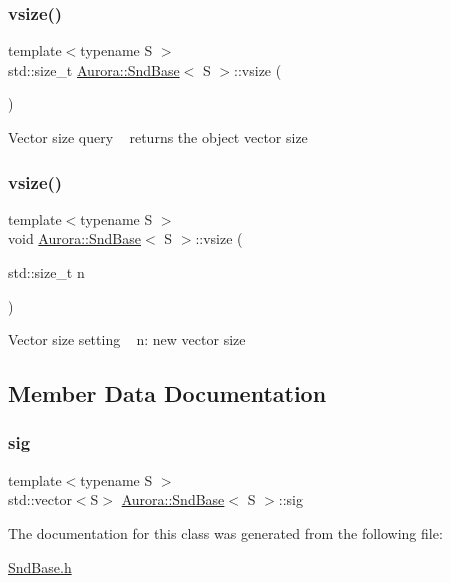 \subsubsection{\texorpdfstring{vsize()}{vsize()}\hspace{0.1cm}{\footnotesize\ttfamily [1/2]}}
{\footnotesize\ttfamily template$<$typename S $>$ \\
std\+::size\+\_\+t \hyperlink{class_aurora_1_1_snd_base}{Aurora\+::\+Snd\+Base}$<$ S $>$\+::vsize (\begin{DoxyParamCaption}{ }\end{DoxyParamCaption})\hspace{0.3cm}{\ttfamily [inline]}}

Vector size query ~\newline
returns the object vector size \mbox{\label{class_aurora_1_1_snd_base_a88dacba995eef179f2fc97e11a331913}} 
\subsubsection{\texorpdfstring{vsize()}{vsize()}\hspace{0.1cm}{\footnotesize\ttfamily [2/2]}}
{\footnotesize\ttfamily template$<$typename S $>$ \\
void \hyperlink{class_aurora_1_1_snd_base}{Aurora\+::\+Snd\+Base}$<$ S $>$\+::vsize (\begin{DoxyParamCaption}\item[{std\+::size\+\_\+t}]{n }\end{DoxyParamCaption})\hspace{0.3cm}{\ttfamily [inline]}}

Vector size setting ~\newline
n\+: new vector size 

\subsection{Member Data Documentation}
\mbox{\label{class_aurora_1_1_snd_base_adad6cd3430a1510dc887cc6bd1a45658}} 
\subsubsection{\texorpdfstring{sig}{sig}}
{\footnotesize\ttfamily template$<$typename S $>$ \\
std\+::vector$<$S$>$ \hyperlink{class_aurora_1_1_snd_base}{Aurora\+::\+Snd\+Base}$<$ S $>$\+::sig\hspace{0.3cm}{\ttfamily [protected]}}



The documentation for this class was generated from the following file\+:\begin{DoxyCompactItemize}
\item 
\hyperlink{_snd_base_8h}{Snd\+Base.\+h}\end{DoxyCompactItemize}
